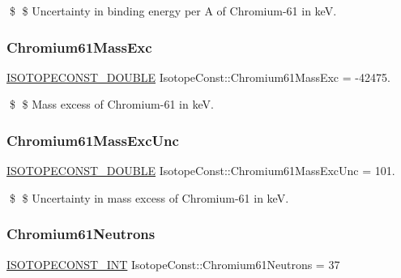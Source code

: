 \$ \$ Uncertainty in binding energy per A of Chromium-\/61 in keV. \mbox{\label{group___isotope_const-_chromium-_cr61_ga76b282dd78bdde02ee13f96b88104790}} 
\subsubsection{\texorpdfstring{Chromium61\+Mass\+Exc}{Chromium61MassExc}}
{\footnotesize\ttfamily \mbox{\hyperlink{group___isotope_const-_macros_ga8f45a7272ce02c0b4c65c44636ed719a}{I\+S\+O\+T\+O\+P\+E\+C\+O\+N\+S\+T\+\_\+\+D\+O\+U\+B\+LE}} Isotope\+Const\+::\+Chromium61\+Mass\+Exc = -\/42475.}

\$ \$ Mass excess of Chromium-\/61 in keV. \mbox{\label{group___isotope_const-_chromium-_cr61_gab47aefca77deff0704347ce34e868c97}} 
\subsubsection{\texorpdfstring{Chromium61\+Mass\+Exc\+Unc}{Chromium61MassExcUnc}}
{\footnotesize\ttfamily \mbox{\hyperlink{group___isotope_const-_macros_ga8f45a7272ce02c0b4c65c44636ed719a}{I\+S\+O\+T\+O\+P\+E\+C\+O\+N\+S\+T\+\_\+\+D\+O\+U\+B\+LE}} Isotope\+Const\+::\+Chromium61\+Mass\+Exc\+Unc = 101.}

\$ \$ Uncertainty in mass excess of Chromium-\/61 in keV. \mbox{\label{group___isotope_const-_chromium-_cr61_ga94ee9378a477d8a99e1821033ac2334f}} 
\subsubsection{\texorpdfstring{Chromium61\+Neutrons}{Chromium61Neutrons}}
{\footnotesize\ttfamily \mbox{\hyperlink{group___isotope_const-_macros_ga5f18360b3e99483a35c32d789e62621c}{I\+S\+O\+T\+O\+P\+E\+C\+O\+N\+S\+T\+\_\+\+I\+NT}} Isotope\+Const\+::\+Chromium61\+Neutrons = 37}

